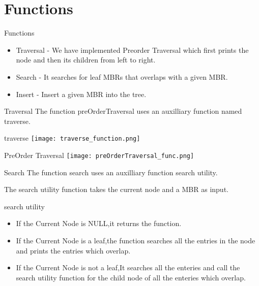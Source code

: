 \documentclass{beamer}
\begin{document}
\section{Functions}
\begin{frame}{Functions}
\begin{itemize}
    \item Traversal - We have implemented Preorder Traversal which first prints the node and then its children from left to right.
    \bigskip
    \item Search - It searches for leaf MBRs that overlaps with a given MBR.
    \bigskip
    \item Insert - Insert a given MBR into the tree.
    \bigskip
\end{itemize}
\end{frame}
\begin{frame}{Traversal}
    The function preOrderTraversal uses an auxilliary function named traverse.
    \begin{block}{traverse}
       \texttt{[image: traverse\_function.png]}
    \end{block}
        
    \begin{block}{PreOrder Traversal}
        \texttt{[image: preOrderTraversal\_func.png]}
    \end{block}
\end{frame}
\begin{frame}{Search}
    The function search uses an auxilliary function search utility.
    
    The search utility function takes the current node and a MBR as input.
    \begin{block}{search utility}
       \begin{itemize}
           \item If the Current Node is NULL,it returns the function.
           \item If the Current Node is a leaf,the function searches all the entries in the node and prints the entries which overlap.
           \item If the Current Node is not a leaf,It searches all the enteries and call the search utility function for the child node of all the enteries which overlap.
       \end{itemize}
    \end{block}
\end{frame}
\end{document}
